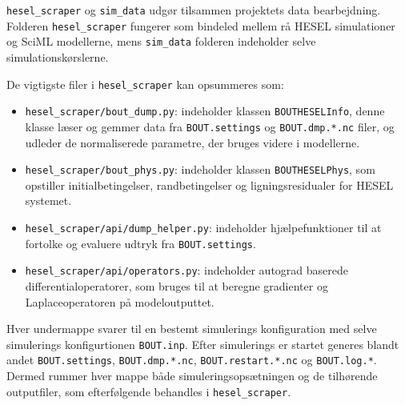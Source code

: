\texttt{hesel\_scraper} og \texttt{sim\_data} udgør tilsammen projektets data bearbejdning. Folderen \texttt{hesel\_scraper} fungerer som bindeled mellem rå HESEL simulationer og SciML modellerne, 
mens \texttt{sim\_data} folderen indeholder selve simulationskørslerne.

De vigtigste filer i \texttt{hesel\_scraper} kan opsummeres som:
\begin{itemize}
    \item \texttt{hesel\_scraper/bout\_dump.py}: indeholder klassen \texttt{BOUTHESELInfo}, denne klasse læser og gemmer data fra \texttt{BOUT.settings} og \texttt{BOUT.dmp.*.nc} filer,
    og udleder de normaliserede parametre, der bruges videre i modellerne.
    \item \texttt{hesel\_scraper/bout\_phys.py}: indeholder klassen \texttt{BOUTHESELPhys}, som opstiller initialbetingelser, randbetingelser og ligningsresidualer for HESEL systemet.
    \item \texttt{hesel\_scraper/api/dump\_helper.py}: indeholder hjælpefunktioner til at fortolke og evaluere udtryk fra \texttt{BOUT.settings}.
    \item \texttt{hesel\_scraper/api/operators.py}: indeholder autograd baserede differentialoperatorer, som bruges til at beregne gradienter og Laplaceoperatoren på modeloutputtet.
\end{itemize}

Hver undermappe svarer til en bestemt simulerings konfiguration med selve simulerings konfigurtionen \texttt{BOUT.inp}.
Efter simulerings er startet generes blandt andet \texttt{BOUT.settings}, \texttt{BOUT.dmp.*.nc}, \texttt{BOUT.restart.*.nc} og \texttt{BOUT.log.*}. Dermed rummer hver mappe både simuleringsopsætningen og de tilhørende outputfiler, som efterfølgende behandles i \texttt{hesel\_scraper}.
